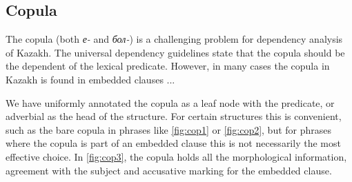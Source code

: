 \documentclass[a4paper,11pt, onecolumn,twoside]{article}
\begin{document}

\subsection{Copula}

The copula (both \emph{е-} and \emph{бол-}) is a challenging problem for dependency 
analysis of Kazakh. The universal dependency guidelines state that the copula should
be the dependent of the lexical predicate. However, in many cases the copula in Kazakh
is found in embedded clauses ...

We have uniformly annotated the copula as a leaf node with the predicate, or adverbial
as the head of the structure. For certain structures this is convenient, such as the
bare copula in phrases like \ref{fig:cop1} or \ref{fig:cop2}, but for phrases where
the copula is part of an embedded clause this is not necessarily the most  
effective choice. In \ref{fig:cop3}, the copula holds all the morphological information,
agreement with the subject and accusative marking for the embedded clause.
\end{document}
